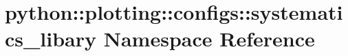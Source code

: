 \hypertarget{namespacepython_1_1plotting_1_1configs_1_1systematics__libary}{
\section{python::plotting::configs::systematics\_\-libary Namespace Reference}
\label{namespacepython_1_1plotting_1_1configs_1_1systematics__libary}
}
